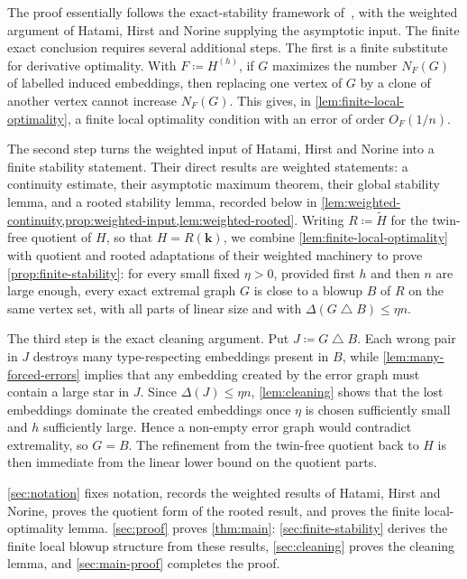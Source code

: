 \documentclass[10pt]{article}
\theoremstyle{plain}
\theoremstyle{remark}
\newcommand{\symdiff}{\mathbin{\triangle}}
\begin{document}
The proof essentially follows the exact-stability framework of~\cite[Theorem~5.8]{Sliacan19}, with the weighted argument of Hatami, Hirst and Norine supplying the asymptotic input. The finite exact conclusion requires several additional steps. The first is a finite substitute for derivative optimality. With $F\coloneqq H^{(h)}$, if $G$ maximizes the number $N_F(G)$ of labelled induced embeddings, then replacing one vertex of $G$ by a clone of another vertex cannot increase $N_F(G)$. This gives, in \cref{lem:finite-local-optimality}, a finite local optimality condition with an error of order $O_F(1/n)$.

The second step turns the weighted input of Hatami, Hirst and Norine into a finite stability statement. Their direct results are weighted statements: a continuity estimate, their asymptotic maximum theorem, their global stability lemma, and a rooted stability lemma, recorded below in \cref{lem:weighted-continuity,prop:weighted-input,lem:weighted-rooted}. Writing $R\coloneqq\widetilde H$ for the twin-free quotient of $H$, so that $H=R(\mathbf k)$, we combine \cref{lem:finite-local-optimality} with quotient and rooted adaptations of their weighted machinery to prove \cref{prop:finite-stability}: for every small fixed $\eta>0$, provided first $h$ and then $n$ are large enough, every exact extremal graph $G$ is close to a blowup $B$ of $R$ on the same vertex set, with all parts of linear size and with $\Delta(G\symdiff B)\le \eta n$.

The third step is the exact cleaning argument. Put $J\coloneqq G\symdiff B$. Each wrong pair in $J$ destroys many type-respecting embeddings present in $B$, while \cref{lem:many-forced-errors} implies that any embedding created by the error graph must contain a large star in $J$. Since $\Delta(J)\le\eta n$, \cref{lem:cleaning} shows that the lost embeddings dominate the created embeddings once $\eta$ is chosen sufficiently small and $h$ sufficiently large. Hence a non-empty error graph would contradict extremality, so $G=B$. The refinement from the twin-free quotient back to $H$ is then immediate from the linear lower bound on the quotient parts.

\medskip

\cref{sec:notation} fixes notation, records the weighted results of Hatami, Hirst and Norine, proves the quotient form of the rooted result, and proves the finite local-optimality lemma. \cref{sec:proof} proves \cref{thm:main}: \cref{sec:finite-stability} derives the finite local blowup structure from these results, \cref{sec:cleaning} proves the cleaning lemma, and \cref{sec:main-proof} completes the proof.
\end{document}
